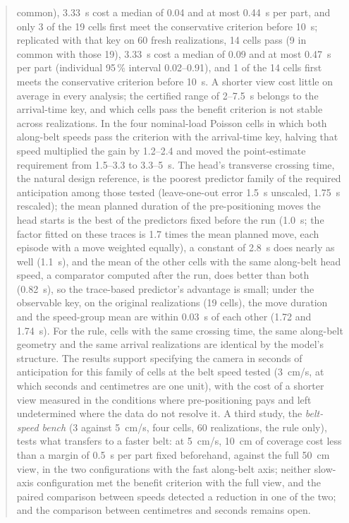 \documentclass[11pt,a4paper]{article}
\begin{document}
\begin{abstract}
common), 3.33~s cost a median of 0.04 and at most 0.44~s per part, and only 3 of the 19
cells first meet the conservative criterion before 10~s; replicated with that key on 60
fresh realizations, 14 cells pass (9 in common with those 19), 3.33~s cost a median of
0.09 and at most 0.47~s per part (individual 95\,\% interval 0.02--0.91), and 1 of the 14
cells first meets the conservative criterion before 10~s. A shorter view cost little on
average in every analysis; the certified range of 2--7.5~s belongs to the arrival-time
key, and which cells pass the benefit criterion is not stable across realizations. In the four nominal-load Poisson cells in which both along-belt speeds pass
the criterion with the arrival-time key, halving that speed multiplied the gain by
1.2--2.4 and moved the point-estimate requirement from 1.5--3.3 to 3.3--5~s. The head's transverse crossing time, the natural design reference,
is the poorest predictor family of the required anticipation among those tested
(leave-one-out error 1.5~s unscaled, 1.75~s rescaled); the mean planned duration of the pre-positioning moves the head starts is
the best of the predictors fixed before the run (1.0~s; the factor fitted on these traces
is 1.7 times the mean planned move, each episode with a move weighted equally), a
constant of 2.8~s does nearly as well (1.1~s), and the mean of the other cells with the same
along-belt head speed, a comparator computed after the run, does better than both
(0.82~s), so the trace-based predictor's advantage is small; under the observable key, on
the original realizations (19 cells), the move duration and the speed-group mean are within 0.03~s of each other (1.72 and
1.74~s). For the rule, cells with the same crossing time, the same along-belt geometry and the
same arrival realizations are identical by the model's structure. The results support specifying the camera in seconds of
anticipation for this family of cells at the belt speed tested (3~cm/s, at which seconds
and centimetres are one unit), with the cost of a shorter view measured in the
conditions where pre-positioning pays and left undetermined where the data do not
resolve it. A third study, the \emph{belt-speed bench} (3 against 5~cm/s, four cells,
60 realizations, the rule only), tests what transfers to a faster belt: at 5~cm/s, 10~cm
of coverage cost less than a margin of 0.5~s per part fixed beforehand, against the full
50~cm view, in the two configurations with the fast along-belt axis; neither slow-axis
configuration met the benefit criterion with the full view, and the paired comparison
between speeds detected a reduction in one of the two; and the comparison between
centimetres and seconds remains open.
\end{abstract}
\end{document}
